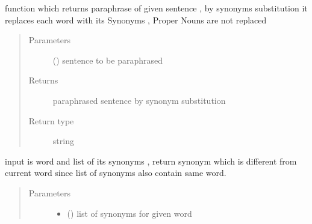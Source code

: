 \documentclass[letterpaper,10pt,english]{sphinxmanual}
\begin{document}
\begin{fulllineitems}

\begin{fulllineitems}
\label{\detokenize{ParaphraseDatasetCreation.Hindi:ParaphraseDatasetCreation.Hindi.Positive.Positive_Paraphrases.get_paraphrase_by_synonym}}
function which returns paraphrase of given sentence , by synonyms substitution
it replaces each word with its Synonyms , Proper Nouns are not replaced
\begin{quote}\begin{description}
\item[{Parameters}] \leavevmode
{} () \textendash{} sentence to be paraphrased

\item[{Returns}] \leavevmode
paraphrased sentence by synonym substitution

\item[{Return type}] \leavevmode
string

\end{description}\end{quote}

\end{fulllineitems}


\begin{fulllineitems}
\label{\detokenize{ParaphraseDatasetCreation.Hindi:ParaphraseDatasetCreation.Hindi.Positive.Positive_Paraphrases.get_synonym}}
input is word and list of its synonyms , return synonym which is different from current word
since list of synonyms also contain same word.
\begin{quote}\begin{description}
\item[{Parameters}] \leavevmode\begin{itemize}
\item {} 
 () \textendash{} list of synonyms for given word


\end{itemize}
\end{description}
\end{quote}
\end{fulllineitems}
\end{fulllineitems}
\end{document}
